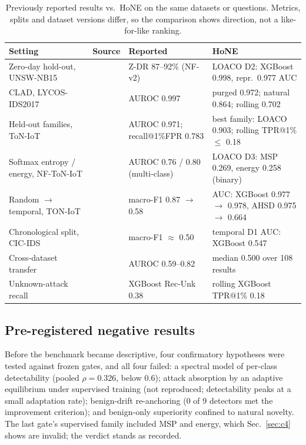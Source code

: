 \documentclass[conference]{IEEEtran}
\newif\ifappendix
\begin{document}
\begin{table}[!t]
\centering\footnotesize\setlength{\tabcolsep}{3pt}
\caption{Previously reported results vs.\ HoNE on the same datasets or questions. Metrics, splits and dataset versions differ, so the comparison shows direction, not a like-for-like ranking.}
\label{tab:prior}
\begin{tabular}{llll}
\toprule
Setting & Source & Reported & HoNE\\
\midrule
Zero-day hold-out, UNSW-NB15 & \cite{sarhan2023zeroshot} & Z-DR 87--92\% (NF-v2) & LOACO D2: XGBoost 0.998, repr.\ 0.977 AUC\\
CLAD, LYCOS-IDS2017 & \cite{wilkie2026} & AUROC 0.997 & purged 0.972; natural 0.864; rolling 0.702\\
Held-out families, ToN-IoT & \cite{nayak2026} & AUROC 0.971; recall@1\%FPR 0.783 & best family: LOACO 0.903; rolling TPR@1\% $\leq$ 0.18\\
Softmax entropy / energy, NF-ToN-IoT & \cite{talpini2024} & AUROC 0.76 / 0.80 (multi-class) & LOACO D3: MSP 0.269, energy 0.258 (binary)\\
Random $\rightarrow$ temporal, TON-IoT & \cite{abdessamad2026} & macro-F1 0.87 $\rightarrow$ 0.58 & AUC: XGBoost 0.977 $\rightarrow$ 0.978, AHSD 0.975 $\rightarrow$ 0.664\\
Chronological split, CIC-IDS & \cite{moczkodan2026} & macro-F1 $\approx$ 0.50 & temporal D1 AUC: XGBoost 0.547\\
Cross-dataset transfer & \cite{cantone2024} & AUROC 0.59--0.82 & median 0.500 over 108 results\\
Unknown-attack recall & \cite{zoppi2023} & XGBoost Rec-Unk 0.38 & rolling XGBoost TPR@1\% 0.18\\
\bottomrule
\end{tabular}
\end{table}

\subsection{Pre-registered negative results}
Before the benchmark became descriptive, four confirmatory hypotheses were tested against frozen gates, and all four failed\ifappendix\ (Appendix~\ref{app:neg})\fi: a spectral model of per-class detectability (pooled $\rho{=}0.326$, below 0.6); attack absorption by an adaptive equilibrium under supervised training (not reproduced; detectability peaks at a small adaptation rate); benign-drift re-anchoring (0 of 9 detectors met the improvement criterion); and benign-only superiority confined to natural novelty. The last gate's supervised family included MSP and energy, which Sec.~\ref{sec:c4} shows are invalid; the verdict stands as recorded.
\end{document}
